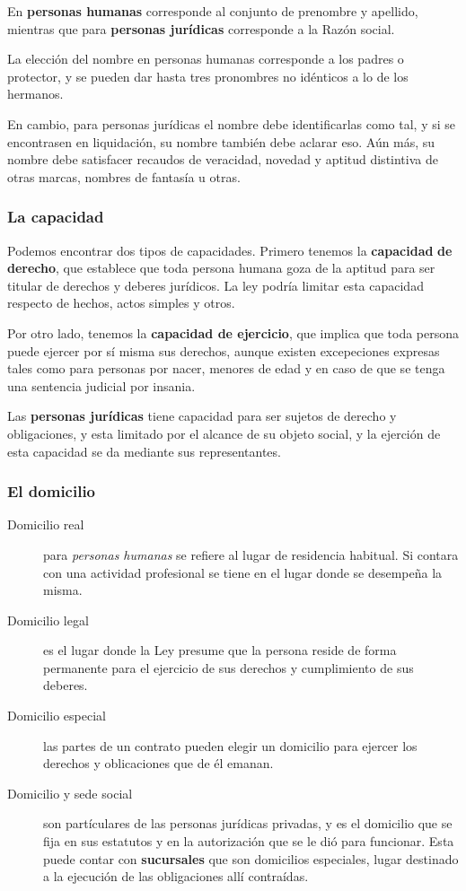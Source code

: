 \documentclass[../resumen.tex]{subfiles}
\begin{document}
En \textbf{personas humanas} corresponde al conjunto de prenombre y apellido, 
mientras que para \textbf{personas jurídicas} corresponde a la Razón social.

La elección del nombre en personas humanas corresponde a los padres o protector,
y se pueden dar hasta tres pronombres no idénticos a lo de los hermanos. 

En cambio, para personas jurídicas el nombre debe identificarlas como tal, y si se
encontrasen en liquidación, su nombre también debe aclarar eso. Aún más, su nombre
debe satisfacer recaudos de veracidad, novedad y aptitud distintiva de otras 
marcas, nombres de fantasía u otras.

\subsubsection{La capacidad}

Podemos encontrar dos tipos de capacidades. Primero tenemos la \textbf{capacidad}
\textbf{de derecho}, que establece que toda persona humana goza de la aptitud para
ser titular de derechos y deberes jurídicos. La ley podría limitar esta capacidad
respecto de hechos, actos simples y otros. 

Por otro lado, tenemos la \textbf{capacidad de ejercicio}, que implica que toda 
persona puede ejercer por sí misma sus derechos, aunque existen excepeciones
expresas tales como para personas por nacer, menores de edad y en caso de que se
tenga una sentencia judicial por insania.

Las \textbf{personas jurídicas} tiene capacidad para ser sujetos de derecho y 
obligaciones, y esta limitado por el alcance de su objeto social, y la ejerción
de esta capacidad se da mediante sus representantes.

\subsubsection{El domicilio}

\begin{description}
  \item[Domicilio real] para \textit{personas humanas} se refiere al lugar de
    residencia habitual. Si contara con una actividad profesional se tiene en el
    lugar donde se desempeña la misma.
  \item[Domicilio legal] es el lugar donde la Ley presume que la persona reside de
    forma permanente para el ejercicio de sus derechos y cumplimiento de sus deberes.
  \item[Domicilio especial] las partes de un contrato pueden elegir un domicilio
    para ejercer los derechos y oblicaciones que de él emanan.
  \item[Domicilio y sede social] son partículares de las personas jurídicas privadas,
    y es el domicilio que se fija en sus estatutos y en la autorización que se le
    dió para funcionar. Esta puede contar con \textbf{sucursales} que son domicilios
    especiales, lugar destinado a la ejecución de las obligaciones allí contraídas.
\end{description}
\end{document}
